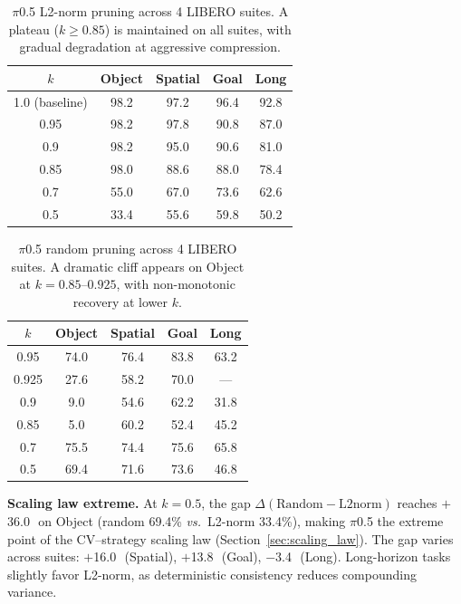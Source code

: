 \documentclass[10pt,letterpaper]{article}
\newcommand{\pp}{\,\text{pp}}
\newcommand{\vs}{\textit{vs.}}
\begin{document}
\begin{table}[t]
\centering
\caption{$\pi$0.5 L2-norm pruning across 4 LIBERO suites. A plateau ($k \geq 0.85$) is maintained on all suites, with gradual degradation at aggressive compression.}
\label{tab:pi05_l2norm}
\small
\begin{tabular}{ccccc}
\toprule
$k$ & Object & Spatial & Goal & Long \\
\midrule
1.0 (baseline) & 98.2 & 97.2 & 96.4 & 92.8 \\
0.95 & 98.2 & 97.8 & 90.8 & 87.0 \\
0.9 & 98.2 & 95.0 & 90.6 & 81.0 \\
0.85 & 98.0 & 88.6 & 88.0 & 78.4 \\
0.7 & 55.0 & 67.0 & 73.6 & 62.6 \\
0.5 & 33.4 & 55.6 & 59.8 & 50.2 \\
\bottomrule
\end{tabular}
\end{table}


\begin{table}[t]
\centering
\caption{$\pi$0.5 random pruning across 4 LIBERO suites. A dramatic cliff appears on Object at $k\!=\!0.85$--$0.925$, with non-monotonic recovery at lower $k$.}
\label{tab:pi05_random}
\small
\begin{tabular}{ccccc}
\toprule
$k$ & Object & Spatial & Goal & Long \\
\midrule
0.95 & 74.0 & 76.4 & 83.8 & 63.2 \\
0.925 & 27.6 & 58.2 & 70.0 & --- \\
0.9 & 9.0 & 54.6 & 62.2 & 31.8 \\
0.85 & 5.0 & 60.2 & 52.4 & 45.2 \\
0.7 & 75.5 & 74.4 & 75.6 & 65.8 \\
0.5 & 69.4 & 71.6 & 73.6 & 46.8 \\
\bottomrule
\end{tabular}
\end{table}

\textbf{Scaling law extreme.} At $k\!=\!0.5$, the gap $\Delta(\text{Random} - \text{L2norm})$ reaches $+$36.0\pp\ on Object (random 69.4\% \vs\ L2-norm 33.4\%), making $\pi$0.5 the extreme point of the CV--strategy scaling law (Section~\ref{sec:scaling_law}). The gap varies across suites: $+$16.0\pp\ (Spatial), $+$13.8\pp\ (Goal), $-$3.4\pp\ (Long). Long-horizon tasks slightly favor L2-norm, as deterministic consistency reduces compounding variance.


\end{document}
